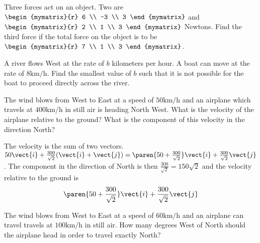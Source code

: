 \begin{ex} Three forces act on an object. Two are $\begin{mymatrix}{r}
6 \\
-3 \\
3
\end{mymatrix} $ and $\begin{mymatrix}{r}
2 \\
1 \\
3
\end{mymatrix} $ Newtons. Find the third force if the total force on the object is
to be $\begin{mymatrix}{r}
7 \\
1 \\
3
\end{mymatrix}$. \vspace{1mm}
\end{ex}

\begin{ex} A river flows West at the rate of $b$ kilometers per hour. A boat can move
at the rate of $8\textrm{km}/\textrm{h}$. Find the smallest value of $b$ such that
it is not possible for the boat to proceed directly across the river.
\vspace{1mm}
\end{ex}

\begin{ex} The wind blows from West to East at a speed of $50\textrm{km}/\textrm{h}$ and
an airplane which travels at $400\textrm{km}/\textrm{h}$ in still air is heading
North West. What is the velocity of the airplane relative to the ground?
What is the component of this velocity in the direction North? \vspace{1mm}
\begin{sol}
The velocity is the sum of two vectors. $50\vect{i}+\frac{
300}{\sqrt{2}} (\vect{i}+\vect{j}) =\paren{50+\frac{300}{\sqrt{2}}
} \vect{i}+ \frac{300}{\sqrt{2}}\vect{j}$. The component in the
direction of North is then $\frac{300}{\sqrt{2}}= 150\sqrt{2}$
and the velocity relative to the ground is
\[
\paren{50+\frac{300}{\sqrt{2}}} \vect{i}+\frac{300}{\sqrt{2}}\vect{j}
\]
\end{sol}
\end{ex}

\begin{ex} The wind blows from West to East at a speed of $60\textrm{km}/\textrm{h}$ and
an airplane can travel travels at $100\textrm{km}/\textrm{h}$ in still air. How
many degrees West of North should the airplane head in order to travel
exactly North? \vspace{1mm}
\end{ex}



